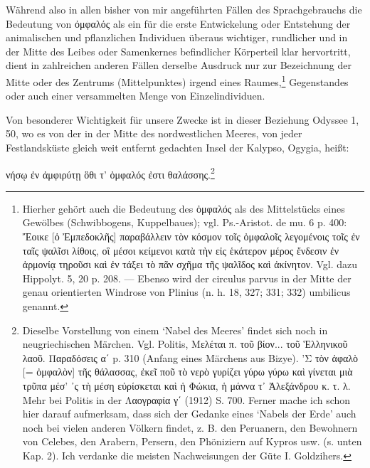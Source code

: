 \documentclass[a4paper, 11pt, oneside]{article}
\begin{document}
Während also in allen bisher von mir angeführten Fällen des Sprachgebrauchs die Bedeutung von ὀμφαλός als ein für die erste Entwickelung oder Entstehung der animalischen und pflanzlichen Individuen überaus wichtiger, rundlicher und in der Mitte des Leibes oder Samenkernes befindlicher Körperteil klar hervortritt, dient in zahlreichen anderen Fällen derselbe Ausdruck nur zur Bezeichnung der Mitte oder des Zentrums (Mittelpunktes) irgend eines Raumes,\footnote{Hierher gehört auch die Bedeutung des ὀμφαλός als des Mittelstücks eines Gewölbes (Schwibbogens, Kuppelbaues); vgl. Ps.-Aristot. de mu. 6 p. 400: Ἔοικε [ὁ Ἐμπεδοκλῆς] παραβάλλειν τὸν κόσμον τοῖς ὀμφαλοῖς λεγομένοις τοῖς ἐν ταῖς ψαλῖσι λίθοις, οἳ μέσοι κείμενοι κατὰ τὴν εἰς ἑκάτερον μέρος ἔνδεσιν ἐν ἁρμονίᾳ τηροῦσι καὶ ἐν τάξει τὸ πᾶν σχῆμα τῆς ψαλῖδος καὶ ἀκίνητον. Vgl. dazu Hippolyt. 5, 20 p. 208. --- Ebenso wird der circulus parvus in der Mitte der genau orientierten Windrose von Plinius (n. h. 18, 327; 331; 332) umbilicus genannt.} Gegenstandes oder auch einer versammelten Menge von Einzelindividuen.

Von besonderer Wichtigkeit für unsere Zwecke ist in dieser Beziehung Odyssee 1, 50, wo es von der in der Mitte des nordwestlichen Meeres, von jeder Festlandsküste gleich weit entfernt gedachten Insel der Kalypso, Ogygia, heißt:

νήσῳ ἐν ἀμφιρύτῃ ὃθι τ' ὀμφαλός ἐστι θαλάσσης.\footnote{Dieselbe Vorstellung von einem `Nabel des Meeres' findet sich noch in neugriechischen Märchen. Vgl. Politis, Μελέται π. τοῦ βίον... τοῦ Ἑλληνικοῦ λαοῦ. Παραδόσεις α΄ p. 310 (Anfang eines Märchens aus Bizye). 'Σ τὸν ἀφαλὸ [= ὀμφαλὸν] τῆς θάλασσας, ἐκεῖ ποῦ τὸ νερὸ γυρίζει γύρω γύρω καὶ γίνεται μιὰ τρῦπα μέσ' ᾿ς τὴ μέση εὑρίσκεται καὶ ἡ Φώκια, ἡ μάννα τ᾿ Ἀλεξάνδρου κ. τ. λ. Mehr bei Politis in der Λαογραφία γ΄ (1912) S. 700. Ferner mache ich schon hier darauf aufmerksam, dass sich der Gedanke eines `Nabels der Erde' auch noch bei vielen anderen Völkern findet, z. B. den Peruanern, den Bewohnern von Celebes, den Arabern, Persern, den Phöniziern auf Kypros usw. (s. unten Kap. 2). Ich verdanke die meisten Nachweisungen der Güte I. Goldzihers.}
\end{document}
